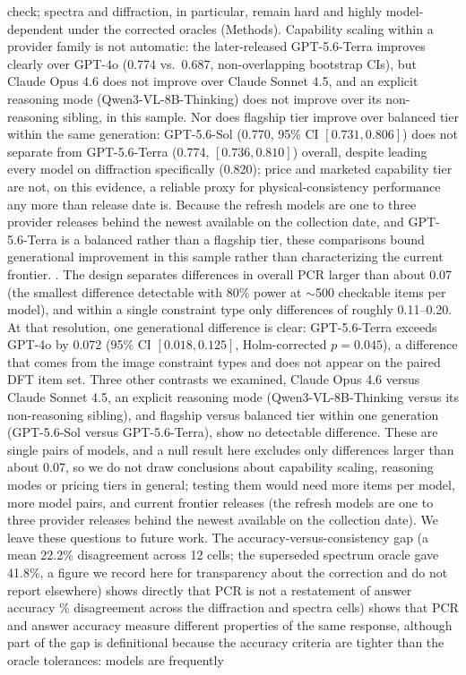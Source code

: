 \documentclass[pdflatex,sn-nature]{sn-jnl}
\newcommand{\rev}[1]{#1} %
\newcommand{\rev}[1]{{\color{blue}#1}} %
\providecommand{\DIFadd}[1]{{\protect\color{blue} \sf #1}} %
\providecommand{\DIFdel}[1]{{\protect\color{red} \scriptsize #1}} %
\providecommand{\DIFaddbegin}{} %
\providecommand{\DIFaddend}{} %
\providecommand{\DIFdelbegin}{} %
\providecommand{\DIFdelend}{} %
\providecommand{\DIFscaledelfig}{0.5}
\newlength{\DIFdelgraphicswidth} %
\newlength{\DIFdelgraphicsheight} %
\providecommand{\DIFaddincludegraphics}[2][]{{\color{blue}\fbox{\DIFOincludegraphics[#1]{#2}}}} %
\providecommand{\DIFdelincludegraphics}[2][]{%
\sbox{\DIFdelgraphicsbox}{\DIFOincludegraphics[#1]{#2}}%
\settoboxwidth{\DIFdelgraphicswidth}{\DIFdelgraphicsbox} %
\settoboxtotalheight{\DIFdelgraphicsheight}{\DIFdelgraphicsbox} %
\scalebox{\DIFscaledelfig}{%
\parbox[b]{\DIFdelgraphicswidth}{\usebox{\DIFdelgraphicsbox}\\[-\baselineskip] \rule{\DIFdelgraphicswidth}{0em}}\llap{\resizebox{\DIFdelgraphicswidth}{\DIFdelgraphicsheight}{%
\setlength{\unitlength}{\DIFdelgraphicswidth}%
\begin{picture}(1,1)%
\thicklines\linethickness{2pt} %
{\color[rgb]{1,0,0}\put(0,0){\framebox(1,1){}}}%
{\color[rgb]{1,0,0}\put(0,0){\line( 1,1){1}}}%
{\color[rgb]{1,0,0}\put(0,1){\line(1,-1){1}}}%
\end{picture}%
}\hspace*{3pt}}} %
} %
\DeclareRobustCommand{\DIFaddbegin}{\DIFOaddbegin \let\includegraphics\DIFaddincludegraphics} %
\DeclareRobustCommand{\DIFaddend}{\DIFOaddend \let\includegraphics\DIFOincludegraphics} %
\DeclareRobustCommand{\DIFdelbegin}{\DIFOdelbegin \let\includegraphics\DIFdelincludegraphics} %
\DeclareRobustCommand{\DIFdelend}{\DIFOaddend \let\includegraphics\DIFOincludegraphics} %
\begin{document}
check; spectra and diffraction, in particular, remain hard and highly model-dependent\DIFdelbegin \DIFdel{under the corrected oracles (Methods). Capability scaling within a provider family is not
automatic: the later-released GPT-5.6-Terra improves clearly over GPT-4o (0.774 vs.\
0.687, non-overlapping bootstrap CIs), but Claude Opus 4.6 does not improve over Claude
Sonnet 4.5, and an explicit reasoning mode (Qwen3-VL-8B-Thinking) does not improve over its
non-reasoning sibling, in this sample. Nor does flagship tier improve over balanced tier
within the same generation: GPT-5.6-Sol (0.770, 95\% CI $[0.731,0.806]$) does not separate
from GPT-5.6-Terra (0.774, $[0.736,0.810]$) overall, despite leading every model on
diffraction specifically (0.820); price and marketed capability tier are not, on this
evidence, a reliable proxy for physical-consistency performance any more than release
date is. Because the refresh models are one to three provider
releases behind the newest available on the collection date, and GPT-5.6-Terra is a
balanced rather than a flagship tier, these comparisons bound generational improvement in
this sample rather than characterizing the current frontier. }\DIFdelend \DIFaddbegin \DIFadd{. \rev{The
design separates differences in overall PCR larger than about 0.07 (the smallest difference
detectable with 80\% power at $\sim$500 checkable items per model), and within a single constraint
type only differences of roughly 0.11--0.20. At that resolution, one generational difference is
clear: GPT-5.6-Terra exceeds GPT-4o by 0.072 (95\% CI $[0.018,0.125]$, Holm-corrected $p=0.045$), a
difference that comes from the image constraint types and does not appear on the paired DFT item set.
Three other contrasts we examined, Claude Opus 4.6 versus Claude Sonnet 4.5, an explicit reasoning
mode (Qwen3-VL-8B-Thinking versus its non-reasoning sibling), and flagship versus balanced tier
within one generation (GPT-5.6-Sol versus GPT-5.6-Terra), show no detectable difference. These are
single pairs of models, and a null result here excludes only differences larger than about 0.07,
so we do not draw conclusions about capability scaling, reasoning modes or pricing tiers in general;
testing them would need more items per model, more model pairs, and current frontier releases (the
refresh models are one to three provider releases behind the newest available on the collection
date). We leave these questions to future work.} }\DIFaddend The accuracy-versus-consistency gap (a mean \DIFdelbegin \DIFdel{22.2\% disagreement across 12 cells; the
superseded spectrum oracle gave 41.8\%, a figure we record here for transparency about the
correction and do not report elsewhere) shows
directly that PCR is not a restatement of answer accuracy}\DIFdelend \DIFaddbegin \DIFadd{\rev{23.6\%
disagreement across the diffraction and spectra cells}) \rev{shows
that PCR and answer accuracy measure different properties of the same response}\rev{, although part of
the gap is definitional because the accuracy criteria are tighter than the oracle tolerances}}\DIFaddend : models are frequently
\end{document}

